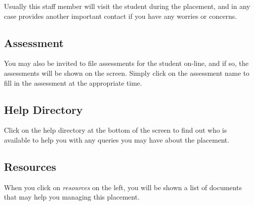 Usually this staff member will visit the student during the placement, and in any case
provides another important contact if you have any worries or concerns.

\subsection{Assessment}

You may also be invited to file assessments for the student on-line, and if so, the
assessments will be shown on the screen. Simply click on the assessment name to fill
in the assessment at the appropriate time.

\subsection{Help Directory}

Click on the help directory at the bottom of the screen to find out who is available
to help you with any queries you may have about the placement.

\subsection{Resources}

When you click on \emph{resources} on the left, you will be shown a list of documents
that may help you managing this placement.
